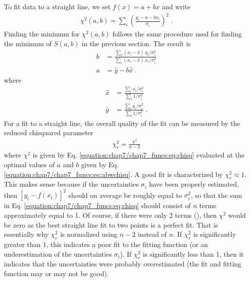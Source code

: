 \documentclass[letterpaper,10pt,english]{sphinxmanual}
\begin{document}
\sphinxAtStartPar
To fit data to a straight line, we set \(f(x) = a + bx\) and write
\begin{equation}\label{equation:chap7/chap7_funcs:eq:chisqlin}
\begin{split}\chi^2(a,b) = \sum_{i} \left(\frac{y_{i} - a -bx_{i}} {\sigma_{i}}\right)^2 \;.\end{split}
\end{equation}
\sphinxAtStartPar
Finding the minimum for \(\chi^2(a,b)\) follows the same procedure used for finding the minimum of \(S(a,b)\) in the previous section.  The result is
\begin{equation}\label{equation:chap7/chap7_funcs:eq:abwchisq}
\begin{split}b &= \frac{\sum_{i}(x_{i} - \hat{x})\,y_{i}/\sigma_{i}^2} {\sum_{i}(x_{i} - \hat{x})\,x_{i}/\sigma_{i}^2}\\
a &= \hat{y} - b\hat{x} \;.\end{split}
\end{equation}
\sphinxAtStartPar
where
\begin{equation}\label{equation:chap7/chap7_funcs:eq:xychisq}
\begin{split}\hat{x} &= \frac{\sum_{i}x_{i}/\sigma_{i}^2} {\sum_{i}1/\sigma_{i}^2}\\
\hat{y} &= \frac{\sum_{i}y_{i}/\sigma_{i}^2} {\sum_{i}1/\sigma_{i}^2}\;.\end{split}
\end{equation}
\sphinxAtStartPar
For a fit to a straight line, the overall quality of the fit can be measured by the reduced chi\sphinxhyphen{}squared parameter
\begin{equation}\label{equation:chap7/chap7_funcs::eq:linreg13}
\begin{split}\chi_{r}^2 = \frac{\chi^2}{n-2}\end{split}
\end{equation}
\sphinxAtStartPar
where \(\chi^2\) is given by Eq. \eqref{equation:chap7/chap7_funcs:eq:chisq} evaluated at the optimal values of \(a\) and \(b\) given by Eq. \eqref{equation:chap7/chap7_funcs:eq:abwchisq}.  A good fit is characterized by \(\chi_{r}^2 \approx 1\).  This makes sense because if the uncertainties \(\sigma_{i}\) have been properly estimated, then \([y_{i}-f(x_{i})]^2\) should on average be roughly equal to \(\sigma_{i}^2\), so that the sum in Eq. \eqref{equation:chap7/chap7_funcs:eq:chisq} should consist of \(n\) terms approximately equal to 1.  Of course, if there were only 2 terms (), then \(\chi^2\) would be zero as the best straight line fit to two points is a perfect fit.  That is essentially why \(\chi_{r}^2\) is normalized using \(n-2\) instead of \(n\).  If \(\chi_{r}^2\) is significantly greater than 1, this indicates a poor fit to the fitting function (or an underestimation of the uncertainties \(\sigma_{i}\)).  If \(\chi_{r}^2\) is significantly less than 1, then it indicates that the uncertainties were probably overestimated (the fit and fitting function may or may not be good).
\end{document}
